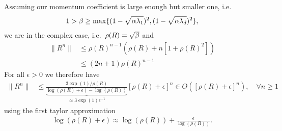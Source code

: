 \begin{theorem}
	Assuming our momentum coefficient is large enough but smaller one, i.e.
	\begin{align*}
		1>\beta
		\ge \max\{(1-\sqrt{\alpha\lambda_1})^2, (1-\sqrt{\alpha\lambda_d})^2\},
	\end{align*}
	we are in the complex case, i.e.\ \(\rho(R) = \sqrt{\beta}\) and
	\begin{align*}
		\|R^n\|
		&\le \rho(R)^{n-1}(\rho(R)+n[1+\rho(R)^2])\\
		&\le (2n+1)\rho(R)^{n-1}
	\end{align*}
	For all \(\epsilon>0\) we therefore have
	\begin{align*}
		\|R^n\|
		&\le \underbrace{\frac{3\exp(1)/\rho(R)}{\log(\rho(R)+\epsilon)-\log(\rho(R))}}_{
			\approx 3\exp(1)\epsilon^{-1}
		}
		[\rho(R)+\epsilon]^n
		\in O([\rho(R)+\epsilon]^n), \quad \forall n\ge 1
	\end{align*}
	using the first taylor approximation
	\begin{align*}
		\log(\rho(R)+\epsilon) \approx \log(\rho(R)) + \frac{\epsilon}{\log(\rho(R))}.
	\end{align*}
\end{theorem}

